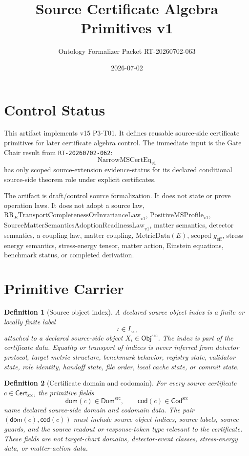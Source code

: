 \documentclass[11pt]{article}
\title{Source Certificate Algebra Primitives v1}
\author{Ontology Formalizer Packet RT-20260702-063}
\date{2026-07-02}
\newcommand{\CertSrc}{\mathsf{Cert}_{\mathrm{src}}}
\newcommand{\Cdom}{\mathsf{dom}}
\newcommand{\Ccod}{\mathsf{cod}}
\newcommand{\Obj}{\mathsf{Obj}^{\mathrm{src}}}
\newcommand{\Dom}{\mathsf{Dom}^{\mathrm{src}}}
\newcommand{\Cod}{\mathsf{Cod}^{\mathrm{src}}}
\newcommand{\NarrowMSCertEq}{\mathrm{NarrowMSCertEq}_{v1}}
\newcommand{\RRELaw}{\mathrm{RR}_{E}\mathrm{TransportCompletenessOrInvarianceLaw}_{v1}}
\newcommand{\PositiveMSProfile}{\mathrm{PositiveMSProfile}_{v1}}
\newcommand{\SMSAR}{\mathrm{SourceMatterSemanticsAdoptionReadinessLaw}_{v1}}
\newcommand{\MetricData}{\mathrm{MetricData}}
\newcommand{\geff}{g_{\mathrm{eff}}}
\newtheorem{definition}{Definition}
\begin{document}
\maketitle

\section{Control Status}

This artifact implements v15 P3-T01. It defines reusable source-side
certificate primitives for later certificate algebra control. The immediate
input is the Gate Chair result from \texttt{RT-20260702-062}: 
\[
  \NarrowMSCertEq
\]
has only scoped source-extension evidence-status for its declared conditional
source-side theorem role under explicit certificates.

The artifact is draft/control source formalization. It does not state or prove
operation laws. It does not adopt a source law, \(\RRELaw\),
\(\PositiveMSProfile\), \(\SMSAR\), matter semantics, detector semantics, a
coupling law, matter coupling, \(\MetricData(E)\), scoped \(\geff\), stress
energy semantics, stress-energy tensor, matter action, Einstein equations,
benchmark status, or completed derivation.

\section{Primitive Carrier}

\begin{definition}[Source object index]
A declared source object index is a finite or locally finite label
\[
  \iota \in I_{\mathrm{src}}
\]
attached to a declared source-side object \(X_{\iota}\in\Obj\). The index is
part of the certificate data. Equality or transport of indices is never
inferred from detector protocol, target metric structure, benchmark behavior,
registry state, validator state, role identity, handoff state, file order,
local cache state, or commit state.
\end{definition}

\begin{definition}[Certificate domain and codomain]
For every source certificate \(c\in\CertSrc\), the primitive fields
\[
  \Cdom(c) \in \Dom,\qquad \Ccod(c) \in \Cod
\]
name declared source-side domain and codomain data. The pair
\((\Cdom(c),\Ccod(c))\) must include source object indices, source labels,
source guards, and the source readout or response-token type relevant to the
certificate. These fields are not target-chart domains, detector-event
classes, stress-energy data, or matter-action data.
\end{definition}
\end{document}
